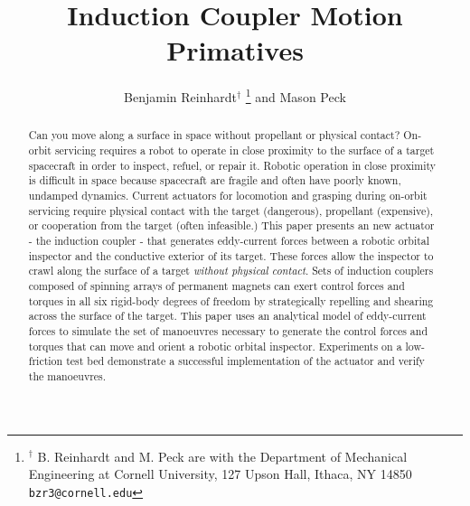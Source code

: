 \documentclass[letterpaper, 10 pt, conference]{ieeeconf}  %
\title{\LARGE \bf
Induction Coupler Motion Primatives
}
\author{Benjamin Reinhardt$^{\dag}$ 
\thanks{$^{\dag}$ B. Reinhardt and M. Peck are with the Department of Mechanical Engineering at Cornell University, 127 Upson Hall, Ithaca, NY 14850 {\tt\small bzr3@cornell.edu}}%
and Mason Peck%
}
\begin{document}
\maketitle
\thispagestyle{empty}
\pagestyle{empty}


\begin{abstract}

Can you move along a surface in space without propellant or physical contact? On-orbit servicing requires a robot to operate in close proximity to the surface of a target spacecraft in order to inspect, refuel, or repair it.  Robotic operation in close proximity is difficult in space because spacecraft are fragile and often have poorly known, undamped dynamics. Current actuators for locomotion and grasping during on-orbit servicing require physical contact with the target (dangerous), propellant (expensive), or cooperation from the target (often infeasible.)   
%
This paper presents an new actuator - the induction coupler - that generates eddy-current forces between a robotic orbital inspector and the conductive exterior of its target. These forces allow the inspector to crawl along the surface of a target \textit{without physical contact}. Sets of induction couplers composed of spinning arrays of permanent magnets can exert control forces and torques in all six rigid-body degrees of freedom by strategically repelling and shearing across the surface of the target. 
%
This paper uses an analytical model of eddy-current forces to simulate the set of manoeuvres necessary to generate the control forces and torques that can move and orient a robotic orbital inspector. Experiments on a low-friction test bed demonstrate a successful implementation of the actuator and verify the manoeuvres.

\end{abstract}


\listoftodos
\end{document}
